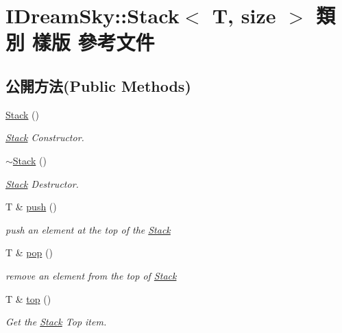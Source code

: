 \hypertarget{class_i_dream_sky_1_1_stack}{}\section{I\+Dream\+Sky\+:\+:Stack$<$ T, size $>$ 類別 樣版 參考文件}
\label{class_i_dream_sky_1_1_stack}
\subsection*{公開方法(Public Methods)}
\begin{DoxyCompactItemize}
\item 
\hyperlink{class_i_dream_sky_1_1_stack_a9879fb17c8077ed302ffb5ebe7ad1087}{Stack} ()
\begin{DoxyCompactList}\small\item\em \hyperlink{class_i_dream_sky_1_1_stack}{Stack} Constructor. \end{DoxyCompactList}\item 
\hyperlink{class_i_dream_sky_1_1_stack_acd898953b9bc07a2636c4173dca1faa5}{$\sim$\+Stack} ()
\begin{DoxyCompactList}\small\item\em \hyperlink{class_i_dream_sky_1_1_stack}{Stack} Destructor. \end{DoxyCompactList}\item 
T \& \hyperlink{class_i_dream_sky_1_1_stack_a836e360afaf8aa57e273c743abdda4cf}{push} ()
\begin{DoxyCompactList}\small\item\em push an element at the top of the \hyperlink{class_i_dream_sky_1_1_stack}{Stack} \end{DoxyCompactList}\item 
T \& \hyperlink{class_i_dream_sky_1_1_stack_a05bd6af72c0c2132677bfdfcecc9fbc5}{pop} ()
\begin{DoxyCompactList}\small\item\em remove an element from the top of \hyperlink{class_i_dream_sky_1_1_stack}{Stack} \end{DoxyCompactList}\item 
T \& \hyperlink{class_i_dream_sky_1_1_stack_a819bed2197292524ec1b7a2286353531}{top} ()
\begin{DoxyCompactList}\small\item\em Get the \hyperlink{class_i_dream_sky_1_1_stack}{Stack} Top item. \end{DoxyCompactList}\item 

\end{DoxyCompactItemize}
